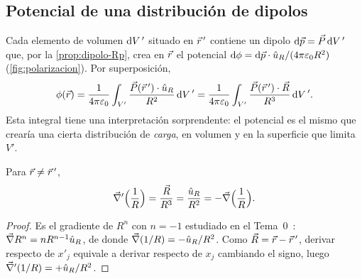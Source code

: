 

\subsection{Potencial de una distribución de dipolos}\label{sec:pol-potencial}
Cada elemento de volumen $\mathrm{d} V\,'$ situado en $\vec{r}\,'$ contiene un dipolo $\mathrm{d}\vec{p}=\vec{P}\,\mathrm{d} V\,'$ que, por la \cref{prop:dipolo-Rp}, crea en $\vec{r}$ el potencial
$\mathrm{d}\phi=\mathrm{d}\vec{p}\cdot\hat{u}_{R}/(4\pi\varepsilon_{0} R^{2})$ (\cref{fig:polarizacion}). Por superposición,
\begin{equation}\label{eq:pot-polarizacion}
  \phi(\vec{r})=\frac{1}{4\pi\varepsilon_{0}}\int_{V'}\frac{\vec{P}(\vec{r}\,')\cdot\hat{u}_{R}}{R^{2}}\,\mathrm{d} V\,'=\frac{1}{4\pi\varepsilon_{0}}\int_{V'}\frac{\vec{P}(\vec{r}\,')\cdot\vec{R}}{R^{3}}\,\mathrm{d} V\,' .
\end{equation}
Esta integral tiene una interpretación sorprendente: el potencial es el mismo que crearía una cierta distribución de \emph{carga}, en volumen y en la
superficie que limita $V'$.

\begin{lema}\label{lem:grad-1R}
Para $\vec{r}\neq\vec{r}\,'$,
\begin{equation}\label{eq:grad-1R}
  \vec{\nabla}'\Bigl(\frac{1}{R}\Bigr)=\frac{\vec{R}}{R^{3}}=\frac{\hat{u}_{R}}{R^{2}}=-\vec{\nabla}\Bigl(\frac{1}{R}\Bigr).
\end{equation}
\end{lema}
\begin{proof}
Es el gradiente de $R^{n}$ con $n=-1$ estudiado en el Tema~0~\cite{TEMA0}: $\vec{\nabla} R^{n}=nR^{n-1}\hat{u}_{R}$, de donde $\vec{\nabla}(1/R)=-\hat{u}_{R}/R^{2}$. Como
$\vec{R}=\vec{r}-\vec{r}\,'$, derivar respecto de $x'_j$ equivale a derivar respecto de $x_j$ cambiando el signo, luego $\vec{\nabla}'(1/R)=+\hat{u}_{R}/R^{2}$.
\end{proof}

